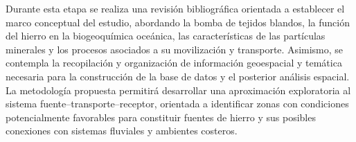 Durante esta etapa se realiza una revisión bibliográfica orientada a establecer el marco conceptual del estudio, abordando la bomba de tejidos blandos, la función del hierro en la biogeoquímica oceánica, las características de las partículas minerales y los procesos asociados a su movilización y transporte. Asimismo, se contempla la recopilación y organización de información geoespacial y temática necesaria para la construcción de la base de datos y el posterior análisis espacial. La metodología propuesta permitirá desarrollar una aproximación exploratoria al sistema fuente--transporte--receptor, orientada a identificar zonas con condiciones potencialmente favorables para constituir fuentes de hierro y sus posibles conexiones con sistemas fluviales y ambientes costeros.

\vspace{1.5cm} %

